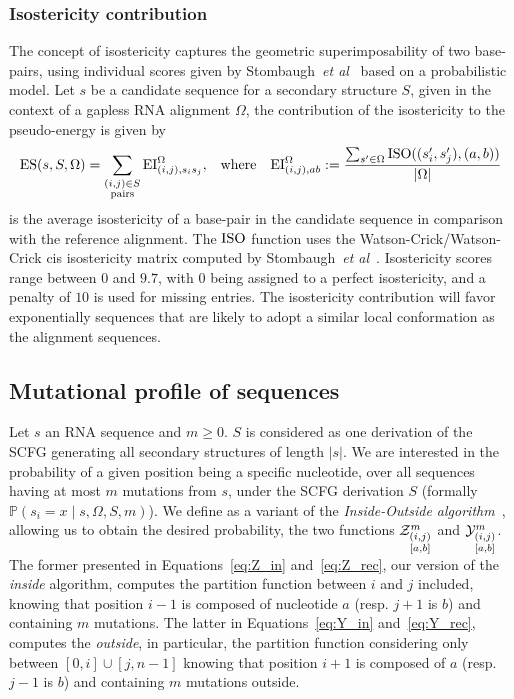 \subsubsection{Isostericity contribution}
The concept of isostericity captures the geometric superimposability of two base-pairs, using individual scores given by Stombaugh~\emph{et al}~\cite{Stombaugh2009} based on a probabilistic model. Let $s$ be a candidate sequence for a secondary structure $S$, given in the context of a gapless RNA alignment $\Omega$,  the contribution of the isostericity to the pseudo-energy is given by
\begin{align*}
  \text{ES}(s,S,\Omega) &= \sum_{\substack{(i,j)\in S\\ \text{pairs}}}\text{EI}^{\Omega}_{(i,j),s_i s_j}, & \text{where}&& 	\text{EI}^{\Omega}_{(i,j),ab}:=
	\frac{
		\sum_{s'\in\Omega}
			\text{\text{ISO}}((s_i',s_j'),(a,b))}
{		
		|\Omega|
	}
\end{align*}
is the average isostericity of a base-pair in the candidate sequence in comparison with the reference alignment.
The $\text{ISO}$ function uses the {Watson-Crick/Watson-Crick} cis isostericity matrix computed by Stombaugh~\emph{et al}~\cite{Stombaugh2009}. Isostericity scores range between $0$ and $9.7$, with $0$ being assigned to a perfect isostericity, and a penalty of $10$ is used for missing entries.
The isostericity contribution will favor exponentially sequences that are likely to adopt a similar local conformation as the alignment sequences.

\subsection{Mutational profile of sequences}

Let $s$ an RNA 
sequence and $m\geq 0$. $S$ is considered as  one derivation of the 
{SCFG} generating  
all  secondary structures of length  $|s|$. We are interested in  
the probability of a given position being a specific nucleotide,
over all sequences having at most $m$ mutations from $s$, under the SCFG derivation $S$ 
(formally 
$\mathbb{P}(s_i = x\mid s,\Omega, S,m)$). 
We define as a variant of the
 \emph{Inside-Outside algorithm}~\cite{Lari1990}, allowing us to obtain the
 desired probability,  the two  functions
$\Z{i,j}{m}{a,b}$ and $\Y{i,j}{m}{a,b}$. The former presented in 
Equations~\eqref{eq:Z_in} and~\eqref{eq:Z_rec}, our 
version of the \emph{inside} algorithm, computes the partition function between $i$ and $j$ included, 
knowing that position $i-1$ is composed of nucleotide $a$ (resp. $j+1$ is $b$) and containing 
$m$ mutations. The latter in Equations~\eqref{eq:Y_in} and~\eqref{eq:Y_rec},
 computes the \emph{outside}, in particular,  
the partition function considering only between $[0,i]\cup[j,n-1]$
knowing  that position $i+1$ is composed of $a$ (resp. $j-1$ is $b$) and containing 
 $m$ mutations outside.



